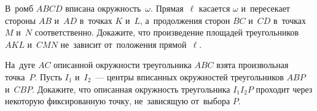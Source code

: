 \begin{problems}
\item
В~ромб $ABCD$ вписана окружность~$\omega$.
Прямая~$\ell$ касается $\omega$ и~пересекает стороны $AB$ и~$AD$ в~точках $K$
и~$L$, а~продолжения сторон $BC$ и~$CD$ в~точках $M$ и~$N$ соответственно.
Докажите, что произведение площадей треугольников $AKL$ и~$CMN$ не~зависит
от~положения прямой~$\ell$.

\item
На~дуге $AC$ описанной окружности треугольника $ABC$ взята произвольная
точка~$P$.
Пусть $I_1$ и~$I_2$~--- центры вписанных окружностей треугольников
$ABP$ и~$CBP$.
Докажите, что описанная окружность треугольника $I_1 I_2 P$ проходит через
некоторую фиксированную точку, не~зависящую от~выбора $P$.

\end{problems}

